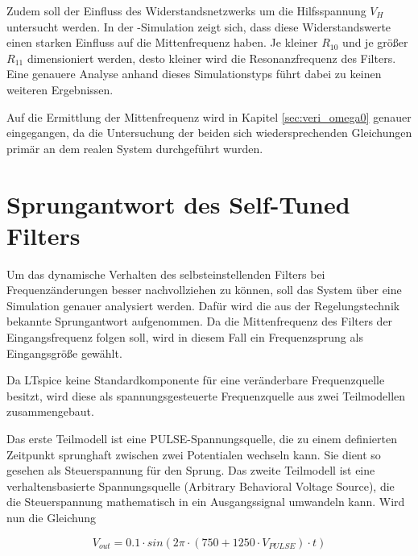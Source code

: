 \documentclass[../main_config.tex]{subfiles}
\begin{document}
Zudem soll der Einfluss des Widerstandsnetzwerks um die Hilfsspannung  $V_H$ untersucht werden. In der -Simulation zeigt sich, dass diese Widerstandswerte einen starken Einfluss auf die Mittenfrequenz haben. Je kleiner $R_{10}$ und je größer $R_{11}$ dimensioniert werden, desto kleiner wird die Resonanzfrequenz des Filters. Eine genauere Analyse anhand dieses Simulationstyps führt dabei zu keinen weiteren Ergebnissen. \par
\medskip

Auf die Ermittlung der Mittenfrequenz wird in Kapitel \ref{sec:veri_omega0} genauer eingegangen, da die Untersuchung der beiden sich wiedersprechenden Gleichungen primär an dem realen System durchgeführt wurden.\par
\medskip



\section{Sprungantwort des Self-Tuned Filters}

Um das dynamische Verhalten des selbsteinstellenden Filters bei Frequenzänderungen besser nachvollziehen zu können, soll das System über eine Simulation genauer analysiert werden. Dafür wird die aus der Regelungstechnik bekannte Sprungantwort aufgenommen. Da die Mittenfrequenz des Filters der Eingangsfrequenz folgen soll, wird in diesem Fall ein Frequenzsprung als Eingangsgröße gewählt.\par
\medskip

Da LTspice keine Standardkomponente für eine veränderbare Frequenzquelle besitzt, wird diese als spannungsgesteuerte Frequenzquelle aus zwei Teilmodellen zusammengebaut.\par
\medskip

Das erste Teilmodell ist eine PULSE-Spannungsquelle, die zu einem definierten Zeitpunkt sprunghaft zwischen zwei Potentialen wechseln kann. Sie dient so gesehen als Steuerspannung für den Sprung. Das zweite Teilmodell ist eine verhaltensbasierte Spannungsquelle (Arbitrary Behavioral Voltage Source), die die Steuerspannung mathematisch in ein Ausgangssignal umwandeln kann. Wird nun die Gleichung\par
\medskip

\begin{equation}
    V_{out}=0.1\cdot sin(2\pi \cdot (750+1250 \cdot V_{PULSE}) \cdot t)
    \label{eq:sim_bv}
\end{equation}
\end{document}
